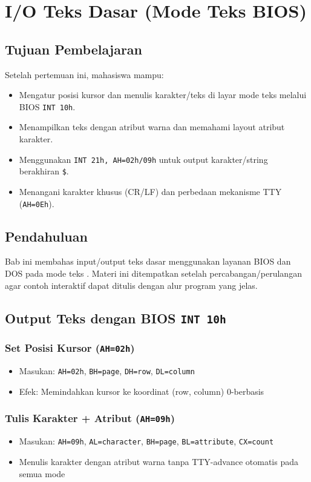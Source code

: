 \documentclass[../main.tex]{subfiles}
\begin{document}
\chapter{I/O Teks Dasar (Mode Teks BIOS)}\label{ch:io-teks}

    \section{Tujuan Pembelajaran}
        Setelah pertemuan ini, mahasiswa mampu:
        \begin{itemize}
            \item Mengatur posisi kursor dan menulis karakter/teks di layar mode teks melalui BIOS \texttt{INT 10h}.
            \item Menampilkan teks dengan atribut warna dan memahami layout atribut karakter.
            \item Menggunakan \texttt{INT 21h, AH=02h/09h} untuk output karakter/string berakhiran \texttt{\$}.
            \item Menangani karakter khusus (CR/LF) dan perbedaan mekanisme TTY (\texttt{AH=0Eh}).
        \end{itemize}

    \section{Pendahuluan}
        Bab ini membahas input/output teks dasar menggunakan layanan BIOS dan DOS pada mode teks \cite{rbil}. Materi ini ditempatkan setelah percabangan/perulangan agar contoh interaktif dapat ditulis dengan alur program yang jelas.

    \section{Output Teks dengan BIOS \texttt{INT 10h}}
        \subsection{Set Posisi Kursor (\texttt{AH=02h})}
            \begin{itemize}
\item Masukan: \texttt{AH=02h}, \texttt{BH=page}, \texttt{DH=row}, \texttt{DL=column}
\item Efek: Memindahkan kursor ke koordinat (row, column) 0-berbasis
            \end{itemize}

        \subsection{Tulis Karakter + Atribut (\texttt{AH=09h})}
            \begin{itemize}
\item Masukan: \texttt{AH=09h}, \texttt{AL=character}, \texttt{BH=page}, \texttt{BL=attribute}, \texttt{CX=count}
\item Menulis karakter dengan atribut warna tanpa TTY-advance otomatis pada semua mode
            \end{itemize}
\end{document}
